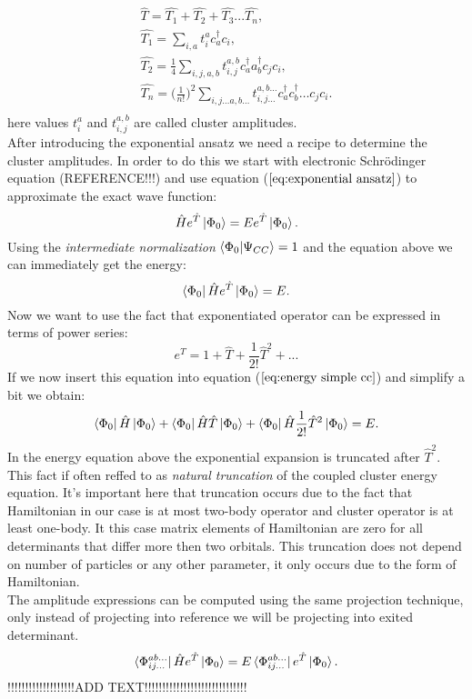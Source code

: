 \documentclass[twoside,english]{uiofysmaster}
\theoremstyle{definition}
\begin{document}
\begin{align} \label{eq:T}
\hat{T}= \hat{T_1}+ \hat{T_2}+ \hat{T_3}...\hat{T_n},  \\
\hat{T_1}= \sum_{i,a} t_i^a c_a^\dagger c_i, \label{eq:T1}\\
\hat{T_2}= \frac{1}{4} \sum_{i,j,a,b} t_{i,j}^{a,b} c_a^\dagger a_b^\dagger c_j c_i,\\
\hat{T_n}= \bigg(\frac{1}{n!}\bigg)^2 \sum_{i,j \dots a,b\dots } t_{i,j\dots}^{a,b\dots}  c_a^\dagger c_b^\dagger \dots c_j c_i.\\
\end{align}
here values $t_i^a $ and $t_{i,j}^{a,b}$ are called cluster amplitudes. \\
After introducing the exponential ansatz we need a recipe to determine the cluster amplitudes. In order to do this we start with electronic Schr\"{o}dinger equation (REFERENCE!!!) and use equation ($\ref{eq:exponential ansatz}$) to approximate the exact wave function:
\begin{equation}
	\hat{H}e^{\hat{T}}\ket{\Phi_0}=Ee^{\hat{T}}\ket{\Phi_0}.
\end{equation}
Using the \textit{intermediate normalization} $\braket{\Phi_0|\Psi_{CC}}=1$ and  the equation above we can immediately get the energy:
\begin{equation}\label{eq:energy simple cc}
\bra{\Phi_0}\hat{H}e^{\hat{T}}\ket{\Phi_0}=E.
\end{equation}
Now we want to use the fact that exponentiated operator can be expressed in terms of power series:
 \begin{equation}
 e^{\hat{T}}= 1+ \hat{T}+\frac{1}{2!}\hat{T}^2+ ...
 \end{equation}
If we now insert this equation into equation ($\ref{eq:energy simple cc}$) and simplify a bit we obtain:
\begin{equation}
 \bra{\Phi_0}\hat{H}\ket{\Phi_0} +  \bra{\Phi_0}\hat{H}\hat{T}\ket{\Phi_0} +\bra{\Phi_0}\hat{H}\frac{1}{2!}\hat{T}^2\ket{\Phi_0}  = E.
\end{equation}
In the energy equation above the exponential expansion is truncated after $\hat{T}^2$. This fact if often reffed to as \textit{natural truncation} of the coupled cluster energy equation. It's important here that truncation occurs due to the fact that Hamiltonian in our case is at most two-body operator and cluster operator is at least one-body. It this case matrix elements of Hamiltonian are zero for all determinants that differ more then two orbitals. This truncation does not depend on number of particles or any other parameter, it only occurs due to the form of Hamiltonian. \\
The amplitude expressions can be computed using the same projection technique, only instead of projecting into reference we will be projecting into exited determinant. 
\begin{equation}\label{eq:ampl simple}
\bra{\Phi_{ij...}^{ab...}}\hat{H} e^{\hat{T}}\ket{\Phi_0} = E\bra{\Phi_{ij...}^{ab...}} e^{\hat{T}}\ket{\Phi_0}.
\end{equation}
!!!!!!!!!!!!!!!!!!!ADD TEXT!!!!!!!!!!!!!!!!!!!!!!!!!!!!!
\end{document}
